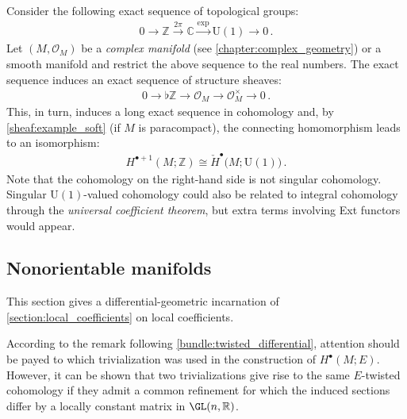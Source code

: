     \begin{property}
        Consider the following exact sequence of topological groups:
        \begin{gather}
            0\longrightarrow\mathbb{Z}\overset{2\pi}{\longrightarrow}\mathbb{C}\overset{\exp}{\longrightarrow}\mathrm{U}(1)\longrightarrow0\,.
        \end{gather}
        Let $(M,\mathcal{O}_M)$ be a \textit{complex manifold} (see \cref{chapter:complex_geometry}) or a smooth manifold and restrict the above sequence to the real numbers. The exact sequence induces an exact sequence of structure sheaves:
        \begin{gather}
            0\longrightarrow\flat\mathbb{Z}\longrightarrow\mathcal{O}_M\longrightarrow\mathcal{O}_M^\times\longrightarrow0\,.
        \end{gather}
        This, in turn, induces a long exact sequence in cohomology and, by \cref{sheaf:example_soft} (if $M$ is paracompact), the connecting homomorphism leads to an isomorphism:
        \begin{gather}
            \label{bundle:U1_cohomology_isomorphism}
            H^{\bullet+1}(M;\mathbb{Z})\cong\check{H}^\bullet\bigl(M;\mathrm{U}(1)\bigr)\,.
        \end{gather}
        Note that the cohomology on the right-hand side is not singular cohomology. Singular $\mathrm{U}(1)$-valued cohomology could also be related to integral cohomology through the \textit{universal coefficient theorem}, but extra terms involving Ext functors would appear.
    \end{property}

\subsection{Nonorientable manifolds}

    This section gives a differential-geometric incarnation of \cref{section:local_coefficients} on local coefficients.

    \begin{remark}
        According to the remark following \cref{bundle:twisted_differential}, attention should be payed to which trivialization was used in the construction of $H^\bullet(M;E)$. However, it can be shown that two trivializations give rise to the same $E$-twisted cohomology if they admit a common refinement for which the induced sections differ by a locally constant matrix in $\GL(n,\mathbb{R})$.
    \end{remark}

